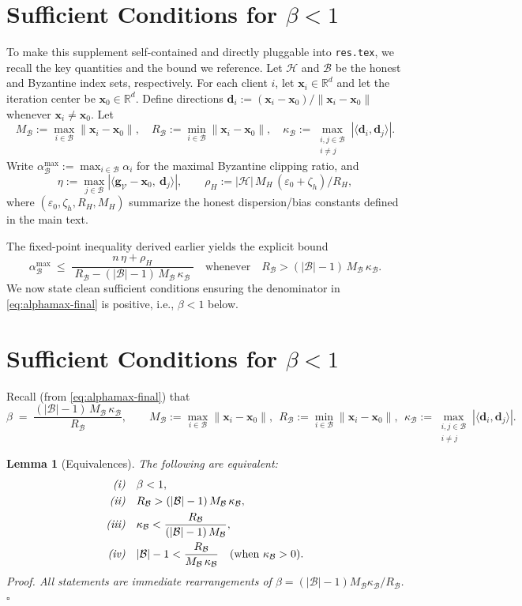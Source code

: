 \documentclass{article}
\theoremstyle{plain}
\newtheorem{lemma}[theorem]{Lemma}
\theoremstyle{definition}
\theoremstyle{remark}
\newcommand{\R}{\mathbb{R}}
\newcommand{\vx}{\bm{x}}
\newcommand{\vg}{\bm{g}}
\newcommand{\vd}{\bm{d}}
\newcommand{\cH}{\mathcal{H}}
\newcommand{\cB}{\mathcal{B}}
\newcommand{\cV}{\mathcal{V}}
\begin{document}
\section*{Sufficient Conditions for \texorpdfstring{$\beta<1$}{beta<1}}

To make this supplement self-contained and directly pluggable into \texttt{res.tex}, we recall the key quantities and the bound we reference. Let $\cH$ and $\cB$ be the honest and Byzantine index sets, respectively. For each client $i$, let $\vx_i\in\R^{d}$ and let the iteration center be $\vx_{0}\in\R^{d}$. Define directions $\vd_i := (\vx_i-\vx_0)/\|\vx_i-\vx_0\|$ whenever $\vx_i\neq \vx_0$. Let
\[
M_{\cB}:=\max_{i\in \cB}\|\vx_i-\vx_0\|,
\quad
R_{\cB}:=\min_{i\in \cB}\|\vx_i-\vx_0\|,
\quad
\kappa_{\cB}:=\max_{\substack{i,j\in \cB\\ i\neq j}}|\langle \vd_i,\vd_j\rangle|.
\]
Write $\alpha^{\max}_{\cB}:=\max_{i\in \cB}\alpha_i$ for the maximal Byzantine clipping ratio, and
\[
\eta := \max_{j\in \cB}|\langle \vg_{\cV}-\vx_0,\ \vd_j\rangle|,
\qquad
\rho_{H}:=|\cH|\,M_{H}\,(\varepsilon_{0}+\zeta_{h})/R_{H},
\]
where $(\varepsilon_{0},\zeta_{h},R_{H},M_{H})$ summarize the honest dispersion/bias constants defined in the main text.

The fixed-point inequality derived earlier yields the explicit bound
\begin{equation}
\boxed{\;
\alpha^{\max}_{\cB}
\ \le\
\frac{n\,\eta+\rho_H}{\;R_{\cB} - (|\cB|-1)\,M_{\cB}\,\kappa_{\cB}\;}
\quad\text{whenever}\quad
R_{\cB} > (|\cB|-1)\,M_{\cB}\,\kappa_{\cB}.
\;}
\label{eq:alphamax-final}
\end{equation}
We now state clean sufficient conditions ensuring the denominator in \eqref{eq:alphamax-final} is positive, i.e., $\beta<1$ below.

\section*{Sufficient Conditions for \texorpdfstring{$\beta<1$}{beta<1}}

Recall (from \eqref{eq:alphamax-final}) that
\[
\beta \;=\; \frac{(|\cB|-1)\,M_{\cB}\,\kappa_{\cB}}{R_{\cB}},
\qquad
M_{\cB}:=\max_{i\in \cB}\|\vx_i-\vx_0\|,
\ \ R_{\cB}:=\min_{i\in \cB}\|\vx_i-\vx_0\|,
\ \ \kappa_{\cB}:=\max_{\substack{i,j\in \cB\\ i\neq j}}|\langle \vd_i,\vd_j\rangle|.
\]

\begin{lemma}[Equivalences]
\label{lem:beta-equiv}
The following are equivalent:
\begin{align*}
\text{\em(i)}\quad& \beta<1,\\
\text{\em(ii)}\quad& R_{\cB} > (|\cB|-1)\,M_{\cB}\,\kappa_{\cB},\\
\text{\em(iii)}\quad& \kappa_{\cB} < \frac{R_{\cB}}{(|\cB|-1)\,M_{\cB}},\\
\text{\em(iv)}\quad& |\cB|-1 < \frac{R_{\cB}}{M_{\cB}\,\kappa_{\cB}}\quad(\text{when }\kappa_{\cB}>0).
\end{align*}
\emph{Proof.} All statements are immediate rearrangements of
$\beta = (|\cB|-1)M_{\cB}\kappa_{\cB}/R_{\cB}$.
\hfill\(\square\)
\end{lemma}
\end{document}
